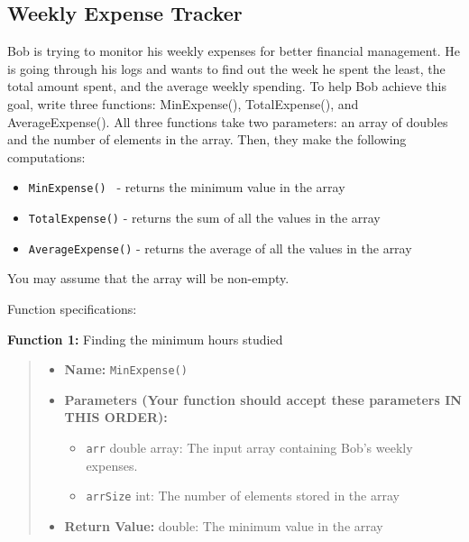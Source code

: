 \subsection{Weekly Expense Tracker}
Bob is trying to monitor his weekly expenses for better financial management. He is going through his logs and wants to find out the week he spent the least, the total amount spent, and the average weekly spending. To help Bob achieve this goal, write three functions: MinExpense(), TotalExpense(), and AverageExpense(). All three functions take two parameters: an array of doubles and the number of elements in the array. Then, they make the following computations:
\begin{itemize}
    \item \texttt{MinExpense() } - returns the minimum value in the array
    \item \texttt{TotalExpense()} - returns the sum of all the values in the array
    \item \texttt{AverageExpense()} - returns the average of all the values in the array
\end{itemize}

You may assume that the array will be non-empty.

Function specifications:

\textbf{Function 1:} Finding the minimum hours studied
\begin{quote}
\begin{itemize}
    \item \textbf{Name:} \texttt{MinExpense()}
    \item \textbf{Parameters (Your function should accept these parameters IN THIS ORDER):}
        \begin{itemize}
            \item \texttt{arr} double array: The input array containing Bob's weekly expenses.
            \item \texttt{arrSize} int: The number of elements stored in the array
        \end{itemize}
    \item \textbf{Return Value:} double: The minimum value in the array
\end{itemize}
\end{quote}



